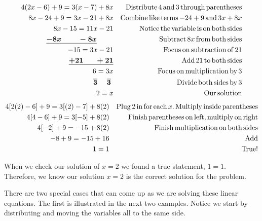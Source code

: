 \begin{example}\label{Lin26}
  
  \begin{eqnarray*}
    4 (2 x - 6) + 9 = 3 (x - 7) + 8 x &  & \operatorname{Distribute} 4 \operatorname{and} 3
    \operatorname{through} \operatorname{parentheses}\\
    8 x - 24 + 9 = 3 x - 21 + 8 x &  & \operatorname{Combine} \operatorname{like} \operatorname{terms}
    - 24 + 9 \operatorname{and} 3 x + 8 x\\
    8 x - 15 = 11 x - 21 &  & \operatorname{Notice} \operatorname{the} \operatorname{variable}
    \operatorname{is} \operatorname{on} \operatorname{both} \operatorname{sides}\\
    \boldsymbol{\underline{- 8 x ~~~~~~~- 8 x}}~~~~~~~  &  & \operatorname{Subtract} 8 x \operatorname{from}
    \operatorname{both} \operatorname{sides}\\
    - 15 = 3 x - 21 &  & \operatorname{Focus} \operatorname{on} \operatorname{subtraction} \operatorname{of}
    21\\
    \boldsymbol{\underline{+ 21 ~~~~~+ 21}}  &  & \operatorname{Add} 21 \operatorname{to} \operatorname{both}
    \operatorname{sides}\\
    6 = 3 x &  & \operatorname{Focus} \operatorname{on} \operatorname{multiplication} \operatorname{by} 3\\
    \boldsymbol{\overline{3} ~~~~ \overline{3} }~  &  & \operatorname{Divide} \operatorname{both}
    \operatorname{sides} \operatorname{by} 3\\
    2 = x &  & \operatorname{Our} \operatorname{solution}
  \end{eqnarray*}
  {}
  \begin{eqnarray*}
    4 [2 (2) - 6] + 9 = 3 [(2) - 7] + 8 (2) &  & \operatorname{Plug} 2 \operatorname{in}
    \operatorname{for} \operatorname{each} x. \operatorname{Multiply} \operatorname{inside}
    \operatorname{parentheses}\\
    4 [4 - 6] + 9 = 3 [- 5] + 8 (2)  &  & \operatorname{Finish} \operatorname{parentheses}
    \operatorname{on} \operatorname{left}, \operatorname{multiply} \operatorname{on} \operatorname{right}\\
    4 [- 2] + 9 = - 15 + 8 (2)  &  & \operatorname{Finish} \operatorname{multiplication}
    \operatorname{on} \operatorname{both} \operatorname{sides}\\
    - 8 + 9 = - 15 + 16 &  & \operatorname{Add}\\
    1 = 1 &  & \operatorname{True} !
  \end{eqnarray*}
\end{example}

 When we check our solution of $x = 2$ we found a true statement, $1 = 1$.
Therefore, we know our solution $x = 2$ is the correct solution for the
problem.\pp

 There are two special cases that can come up as we are solving these linear
equations. The first is illustrated in the next two examples. Notice we start
by distributing and moving the variables all to the same side.\pp

